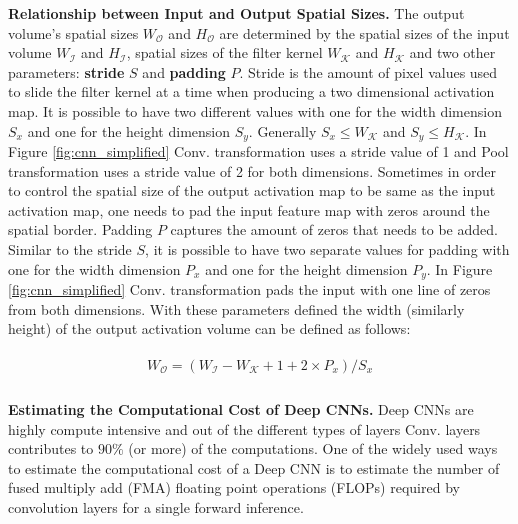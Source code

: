 \vspace{2mm}
\noindent \textbf{Relationship between Input and Output Spatial Sizes.}
The output volume's spatial sizes $W_{\mathcal{O}}$ and $H_{\mathcal{O}}$ are determined by the spatial sizes of the input volume $W_{\mathcal{I}}$ and $H_{\mathcal{I}}$, spatial sizes of the filter kernel $W_\mathcal{K}$ and $H_\mathcal{K}$ and two other parameters: \textbf{stride} $S$ and \textbf{padding} $P$.
Stride is the amount of pixel values used to slide the filter kernel at a time when producing a two dimensional activation map.
It is possible to have two different values with one for the width dimension $S_x$ and one for the height dimension $S_y$.
Generally $S_x \leq W_\mathcal{K}$ and $S_y \leq H_\mathcal{K}$.
In Figure \ref{fig:cnn_simplified} Conv. transformation uses a stride value of 1 and Pool transformation uses a stride value of 2 for both dimensions.
Sometimes in order to control the spatial size of the output activation map to be same as the input activation map, one needs to pad the input feature map with zeros around the spatial border.
Padding $P$ captures the amount of zeros that needs to be added.
Similar to the stride $S$, it is possible to have two separate values for padding with one for the width dimension $P_x$ and one for the height dimension $P_y$.
In Figure \ref{fig:cnn_simplified} Conv. transformation pads the input with one line of zeros from both dimensions.
With these parameters defined the width (similarly height) of the output activation volume can be defined as follows:

\begin{align}
\begin{split}
W_{\mathcal{O}} = (W_{\mathcal{I}} - W_\mathcal{K} + 1 + 2\times P_x)/S_x \\
\end{split}
\end{align}

\vspace{2mm}
\noindent \textbf{Estimating the Computational Cost of Deep CNNs.}
Deep CNNs are highly compute intensive and out of the different types of layers Conv. layers contributes to $90\%$ (or more) of the computations. One of the widely used ways to estimate the computational cost of a Deep CNN is to estimate the number of fused multiply add (FMA) floating point operations (FLOPs) required by convolution layers for a single forward inference.

